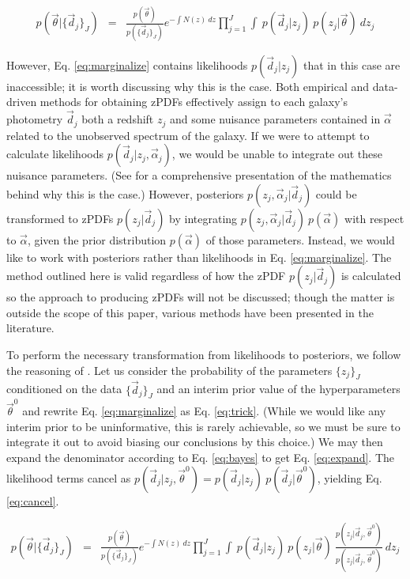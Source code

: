 \documentclass[preprint]{aastex}
\begin{document}
\begin{eqnarray}
\label{eq:marginalize}
p(\vec{\theta}|\{\vec{d}_{j}\}_{J}) &=& \frac{p(\vec{\theta})}{p(\{\vec{d}_{j}\}_{J})}e^{-\int N(z)\ dz}\prod_{j=1}^{J}\int\ p(\vec{d}_{j}|z_{j})\ p(z_{j}|\vec{\theta})\ dz_{j}
\end{eqnarray}

However, Eq. \ref{eq:marginalize} contains likelihoods $p(\vec{d}_{j}|z_{j})$ that in this case are inaccessible; it is worth discussing why this is the case.  Both empirical and data-driven methods for obtaining zPDFs effectively assign to each galaxy's photometry $\vec{d}_{j}$ both a redshift $z_{j}$ and some nuisance parameters contained in $\vec{\alpha}$ related to the unobserved spectrum of the galaxy.  If we were to attempt to calculate likelihoods $p(\vec{d}_{j}|z_{j},\vec{\alpha}_{j})$, we would be unable to integrate out these nuisance parameters.  (See \citet{hog12} for a comprehensive presentation of the mathematics behind why this is the case.)  However, posteriors $p(z_{j},\vec{\alpha}_{j}|\vec{d}_{j})$ could be transformed to zPDFs $p(z_{j}|\vec{d}_{j})$ by integrating $p(z_{j},\vec{\alpha}_{j}|\vec{d}_{j})\ p(\vec{\alpha})$ with respect to $\vec{\alpha}$, given the prior distribution $p(\vec{\alpha})$ of those parameters.  Instead, we would like to work with posteriors rather than likelihoods in Eq. \ref{eq:marginalize}.  The method outlined here is valid regardless of how the zPDF $p(z_{j}|\vec{d}_{j})$ is calculated so the approach to producing zPDFs will not be discussed; though the matter is outside the scope of this paper, various methods have been presented in the literature. \citep{she11, bal08, car13, car14a}

To perform the necessary transformation from likelihoods to posteriors, we follow the reasoning of \citet{mar15}.  Let us consider the probability of the parameters $\{z_{j}\}_{J}$ conditioned on the data $\{\vec{d}_{j}\}_{J}$ and an interim prior value of the hyperparameters $\vec{\theta}^{0}$ and rewrite Eq. \ref{eq:marginalize} as Eq. \ref{eq:trick}.  (While we would like any interim prior to be uninformative, this is rarely achievable, so we must be sure to integrate it out to avoid biasing our conclusions by this choice.)  We may then expand the denominator according to Eq. \ref{eq:bayes} to get Eq. \ref{eq:expand}.  The likelihood terms cancel as $p(\vec{d}_{j}|z_{j},\vec{\theta}^{0})=p(\vec{d}_{j}|z_{j})\ p(\vec{d}_{j}|\vec{\theta}^{0})$, yielding Eq. \ref{eq:cancel}.

\begin{eqnarray}
\label{eq:trick}
p(\vec{\theta}|\{\vec{d}_{j}\}_{J}) &=& \frac{p(\vec{\theta})}{p(\{\vec{d}_{j}\}_{J})}e^{-\int N(z)\ dz}\prod_{j=1}^{J}\int\ p(\vec{d}_{j}|z_{j})\ p(z_{j}|\vec{\theta})\ \frac{p(z_{j}|\vec{d}_{j},\vec{\theta}^{0})}{p(z_{j}|\vec{d}_{j},\vec{\theta}^{0})}\ dz_{j}
\end{eqnarray}
\end{document}
